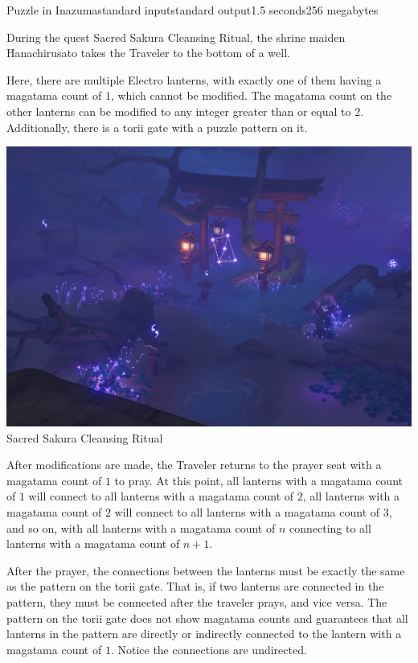 \begin{problem}{Puzzle in Inazuma}{standard input}{standard output}{1.5 seconds}{256 megabytes}

During the quest Sacred Sakura Cleansing Ritual, the shrine maiden Hanachirusato takes the Traveler to the bottom of a well.

Here, there are multiple Electro lanterns, with exactly one of them having a magatama count of $1$, which cannot be modified. The magatama count on the other lanterns can be modified to any integer greater than or equal to $2$. Additionally, there is a torii gate with a puzzle pattern on it.

\begin{center}
  \includegraphics[scale=0.25]{puzzle.jpg} \\
  \small{Sacred Sakura Cleansing Ritual}
\end{center}

After modifications are made, the Traveler returns to the prayer seat with a magatama count of $1$ to pray. At this point, all lanterns with a magatama count of $1$ will connect to all lanterns with a magatama count of $2$, all lanterns with a magatama count of $2$ will connect to all lanterns with a magatama count of $3$, and so on, with all lanterns with a magatama count of $n$ connecting to all lanterns with a magatama count of $n + 1$.

After the prayer, the connections between the lanterns must be exactly the same as the pattern on the torii gate. That is, if two lanterns are connected in the pattern, they must be connected after the traveler prays, and vice versa. The pattern on the torii gate does not show magatama counts and guarantees that all lanterns in the pattern are directly or indirectly connected to the lantern with a magatama count of $1$. Notice the connections are undirected.


\end{problem}
